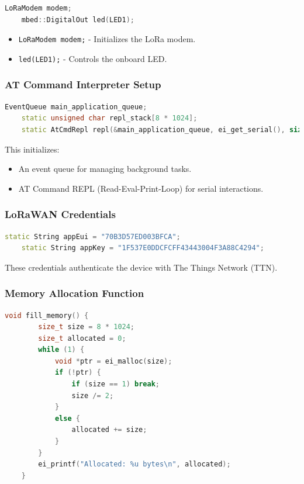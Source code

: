 \begin{lstlisting}[language=C++, caption=LoRa Modem and LED Setup]
	LoRaModem modem;
	mbed::DigitalOut led(LED1);
\end{lstlisting}

\begin{itemize}
	\item \texttt{LoRaModem modem;} - Initializes the LoRa modem.
	\item \texttt{led(LED1);} - Controls the onboard LED.
\end{itemize}

\subsubsection{AT Command Interpreter Setup}

\begin{lstlisting}[language=C++, caption=AT Command Interpreter Setup]
	EventQueue main_application_queue;
	static unsigned char repl_stack[8 * 1024];
	static AtCmdRepl repl(&main_application_queue, ei_get_serial(), sizeof(repl_stack), repl_stack, 5);
\end{lstlisting}

This initializes:
\begin{itemize}
	\item An event queue for managing background tasks.
	\item AT Command REPL (Read-Eval-Print-Loop) for serial interactions.
\end{itemize}

\subsubsection{LoRaWAN Credentials}

\begin{lstlisting}[language=C++, caption=LoRaWAN Credentials]
	static String appEui = "70B3D57ED003BFCA";
	static String appKey = "1F537E0DDCFCFF43443004F3A88C4294";
\end{lstlisting}

These credentials authenticate the device with The Things Network (TTN).

\subsubsection{Memory Allocation Function}

\begin{lstlisting}[language=C++, caption=Memory Allocation]
	void fill_memory() {
		size_t size = 8 * 1024;
		size_t allocated = 0;
		while (1) {
			void *ptr = ei_malloc(size);
			if (!ptr) {
				if (size == 1) break;
				size /= 2;
			}
			else {
				allocated += size;
			}
		}
		ei_printf("Allocated: %u bytes\n", allocated);
	}
\end{lstlisting}

